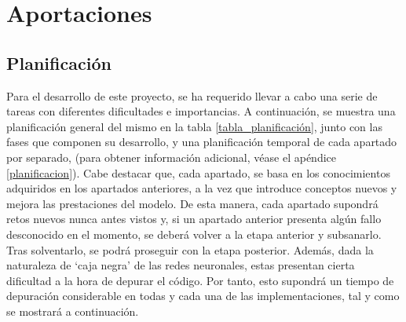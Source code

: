 \chapter{Aportaciones}

\section{Planificación}

Para el desarrollo de este proyecto, se ha requerido llevar a cabo una serie de tareas con diferentes dificultades e importancias. A continuación, se muestra una planificación general del mismo en la tabla \ref{tabla_planificación}, junto con las fases que componen su desarrollo, y una planificación temporal de cada apartado por separado,  (para obtener información adicional, véase el apéndice \ref{planificacion}). Cabe destacar que, cada apartado, se basa en los conocimientos adquiridos en los apartados anteriores, a la vez que introduce conceptos nuevos y mejora las prestaciones del modelo. De esta manera, cada apartado supondrá retos nuevos nunca antes vistos y, si un apartado anterior presenta algún fallo desconocido en el momento, se deberá volver a la etapa anterior y subsanarlo. Tras solventarlo, se podrá proseguir con la etapa posterior. Además, dada la naturaleza de `caja negra' de las redes neuronales, estas presentan cierta dificultad a la hora de depurar el código. Por tanto, esto supondrá un tiempo de depuración considerable en todas y cada una de las implementaciones, tal y como se mostrará a continuación.

